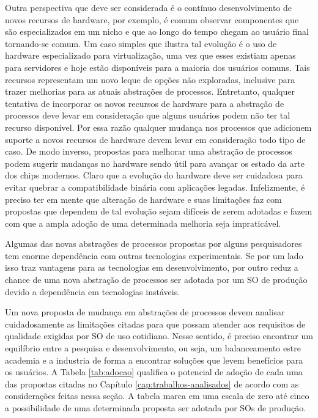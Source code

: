 Outra perspectiva que deve ser considerada é o contínuo desenvolvimento de novos
recursos de hardware, por exemplo, é comum observar componentes que
são especializados em um nicho e que ao longo do tempo chegam ao usuário
final tornando-se comum. Um caso simples que ilustra tal evolução é o
uso de hardware especializado para virtualização, uma vez que esses existiam
apenas para servidores e hoje estão disponíveis para a maioria dos usuários
comuns. Tais recursos representam um novo leque de opções não exploradas,
inclusive para trazer melhorias para as atuais abstrações de processos.
Entretanto, qualquer tentativa de incorporar os novos recursos de hardware para
a abstração de processos deve levar em consideração que alguns usuários podem
não ter tal recurso disponível. Por essa razão qualquer mudança nos processos
que adicionem suporte a novos recursos de hardware devem levar em consideração
todo tipo de caso. De modo inverso, propostas para melhorar uma abstração de
processos podem sugerir mudanças no hardware sendo útil para avançar os
estado da arte dos chips modernos. Claro que a evolução do hardware deve ser
cuidadosa para evitar quebrar a compatibilidade binária com aplicações legadas.
Infelizmente, é preciso ter em mente que alteração de hardware e suas
limitações faz com propostas que dependem de tal evolução sejam difíceis de
serem adotadas e fazem com que a ampla adoção de uma determinada melhoria seja
impraticável.

Algumas das novas abstrações de processos propostas por alguns pesquisadores
tem enorme dependência com outras tecnologias experimentais. Se por um lado
isso traz vantagens para as tecnologias em desenvolvimento, por outro reduz a
chance de uma nova abstração de processos ser adotada por um SO de produção
devido a dependência em tecnologias instáveis.

Um nova proposta de mudança em abstrações de processos devem analisar
cuidadosamente as limitações citadas para que possam atender aos requisitos de
qualidade exigidas por SO de uso cotidiano. Nesse sentido, é preciso encontrar
um equilíbrio entre a pesquisa e desenvolvimento, ou seja, um balanceamento
estre academia e a industria de forma a encontrar soluções que levem benefícios
para os usuários. A Tabela \ref{tab:adocao} qualifica o potencial de adoção de
cada uma das propostas citadas no Capítulo \ref{cap:trabalhos-analisados} de
acordo com as considerações feitas nessa seção. A tabela marca em uma escala de
zero até cinco a possibilidade de uma determinada proposta ser adotada por SOs
de produção.

